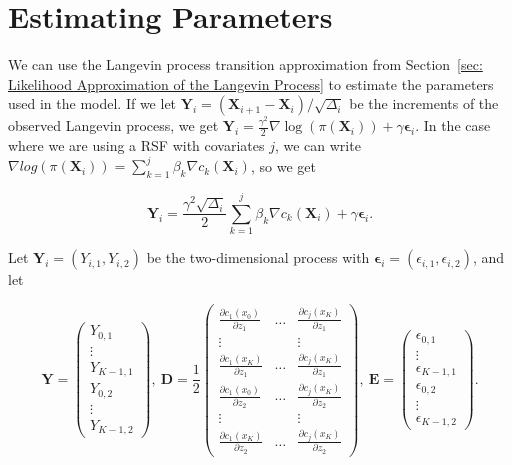\section{Estimating Parameters}
\label{sec: estimating parameters}
We can use the Langevin process transition approximation from Section~\ref{sec: Likelihood Approximation of the Langevin Process} to estimate the parameters used in the model. If we let $\textbf{Y}_i = (\textbf{X}_{i+1} - \textbf{X}_i)/\sqrt{\Delta_i}$ be the increments of the observed Langevin process, we get $\textbf{Y}_i = \frac{\gamma^2}{2}\nabla \log(\pi(\textbf{X}_i)) + \gamma \bm \epsilon_i$. In the case where we are using a RSF with covariates $j$, we can write $\nabla log(\pi(\textbf{X}_i)) = \sum_{k = 1}^j \beta_k \nabla c_k(\textbf{X}_i)$, so we get

$$
    \textbf{Y}_i = \frac{\gamma^2 \sqrt{\Delta_i}}{2}\sum_{k = 1}^j \beta_k \nabla c_k(\textbf{X}_i) + \gamma \bm \epsilon_i.
$$

Let $\textbf{Y}_i = (Y_{i,1}, Y_{i,2})$ be the two-dimensional process with $\bm \epsilon_i =(\epsilon_{i,1}, \epsilon_{i,2})$, and let

$$
    \mathbf{Y} = \begin{pmatrix}
        Y_{0,1} \\
        \vdots \\
        Y_{K-1,1}\\
        Y_{0,2}\\
        \vdots\\
        Y_{K-1,2}
    \end{pmatrix} , \    
    \mathbf{D} = \frac{1}{2} 
    \begin{pmatrix}
        \frac{\partial c_1(x_0)}{\partial z_1} & \dots & \frac{\partial c_j(x_K)}{\partial z_1} \\
        \vdots & & \vdots \\
        \frac{\partial c_1(x_K)}{\partial z_1} & \dots & \frac{\partial c_j(x_K)}{\partial z_1} \\
        \frac{\partial c_1(x_0)}{\partial z_2} & \dots & \frac{\partial c_j(x_K)}{\partial z_2} \\
        \vdots & & \vdots \\
        \frac{\partial c_1(x_K)}{\partial z_2} & \dots & \frac{\partial c_j(x_K)}{\partial z_2}
    \end{pmatrix} , \
    \mathbf{E} =\begin{pmatrix}
        \epsilon_{0,1} \\
        \vdots \\
        \epsilon_{K-1,1}\\
        \epsilon_{0,2}\\
        \vdots\\
        \epsilon_{K-1,2}
    \end{pmatrix}.
$$



